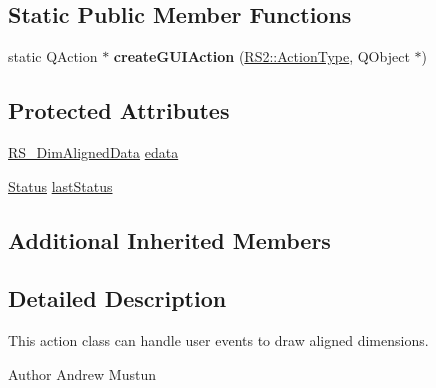 \subsection*{Static Public Member Functions}
\begin{DoxyCompactItemize}
\item 
\hypertarget{classRS__ActionDimAligned_a0cb7d36c0691dedb5b576629cb2a0123}{static Q\-Action $\ast$ {\bfseries create\-G\-U\-I\-Action} (\hyperlink{classRS2_afe3523e0bc41fd637b892321cfc4b9d7}{R\-S2\-::\-Action\-Type}, Q\-Object $\ast$)}\label{classRS__ActionDimAligned_a0cb7d36c0691dedb5b576629cb2a0123}

\end{DoxyCompactItemize}
\subsection*{Protected Attributes}
\begin{DoxyCompactItemize}
\item 
\hyperlink{classRS__DimAlignedData}{R\-S\-\_\-\-Dim\-Aligned\-Data} \hyperlink{classRS__ActionDimAligned_aa8697d005721a4180a4dda9f1835260b}{edata}
\item 
\hyperlink{classRS__ActionDimAligned_a5583690cd24c860178d14fdd19d66529}{Status} \hyperlink{classRS__ActionDimAligned_a1fdf882b21c984da35c3ffa0539fd064}{last\-Status}
\end{DoxyCompactItemize}
\subsection*{Additional Inherited Members}


\subsection{Detailed Description}
This action class can handle user events to draw aligned dimensions.

\begin{DoxyAuthor}{Author}
Andrew Mustun 
\end{DoxyAuthor}


